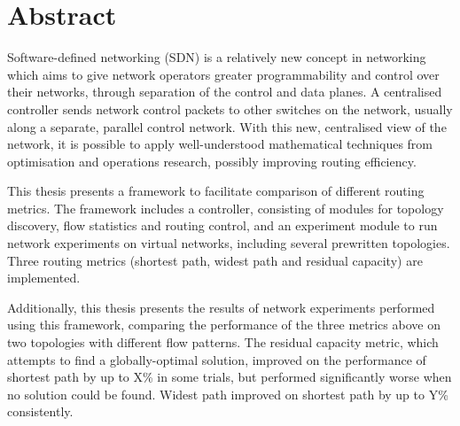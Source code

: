 \chapter{Abstract}

Software-defined networking (SDN) is a relatively new concept in networking which aims to give network operators greater programmability and control over their networks, through separation of the control and data planes. A centralised controller sends network control packets to other switches on the network, usually along a separate, parallel control network. With this new, centralised view of the network, it is possible to apply well-understood mathematical techniques from optimisation and operations research, possibly improving routing efficiency.

This thesis presents a framework to facilitate comparison of different routing metrics. The framework includes a controller, consisting of modules for topology discovery, flow statistics and routing control, and an experiment module to run network experiments on virtual networks, including several prewritten topologies. Three routing metrics (shortest path, widest path and residual capacity) are implemented.

Additionally, this thesis presents the results of network experiments performed using this framework, comparing the performance of the three metrics above on two topologies with different flow patterns. The residual capacity metric, which attempts to find a globally-optimal solution, improved on the performance of shortest path by up to X\% in some trials, but performed significantly worse when no solution could be found. Widest path improved on shortest path by up to Y\% consistently.
